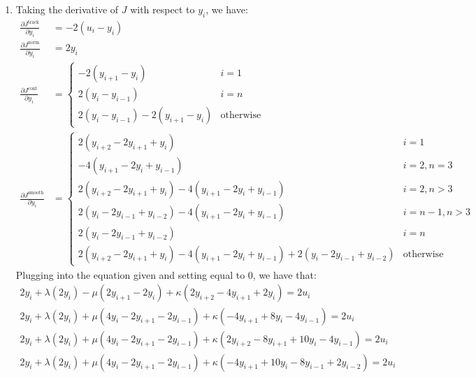 \documentclass[12pt]{exam}
\begin{document}
\begin{questions}
\begin{solution}
  \begin{enumerate}[label=(\alph*)]
    \item Taking the derivative of $J$ with respect to $y_i$, we have:
    \begin{align*}
      \frac{\partial J^{\text{track}}}{\partial y_i} &= -2(u_i - y_i) \\
      \frac{\partial J^{\text{norm}}}{\partial y_i} &= 2y_i \\
      \frac{\partial J^{\text{cont}}}{\partial y_i} &= 
      \begin{cases}
      - 2(y_{i+1} - y_{i}) & i = 1 \\
        2(y_i - y_{i-1}) & i = n \\
        2(y_i - y_{i-1}) - 2(y_{i+1} - y_{i}) & \text{otherwise}
      \end{cases} \\
      \frac{\partial J^{\text{smooth}}}{\partial y_i} &= 
      \begin{cases}
          2(y_{i+2} - 2y_{i+1} + y_{i}) & i = 1 \\
          -4(y_{i+1} - 2y_{i} + y_{i-1}) &  i = 2, n = 3\\
          2(y_{i+2} - 2y_{i+1} + y_{i}) - 4(y_{i+1} - 2y_{i} + y_{i-1}) & i = 2, n > 3 \\
          2(y_{i} - 2y_{i-1} + y_{i-2}) - 4(y_{i+1} - 2y_{i} + y_{i-1}) & i = n - 1, n > 3 \\
          2(y_{i} - 2y_{i-1} + y_{i-2}) & i = n \\
          2(y_{i+2} - 2y_{i+1} + y_{i}) - 4(y_{i+1} - 2y_{i} + y_{i-1}) + 2(y_i - 2y_{i-1} + y_{i-2}) & \text{otherwise}
      \end{cases}
    \end{align*}
    Plugging into the equation given and setting equal to $0$, we have that:
    \begin{align*}
      2y_i +  \lambda (2y_i) - \mu(2y_{i+1} - 2y_i) + \kappa(2y_{i+2} - 4y_{i+1} + 2y_i) = 2u_i \tag{$i = 1$} \\
      2y_i + \lambda (2y_i) + \mu(4y_i - 2y_{i+1} - 2y_{i-1}) + \kappa(-4y_{i+1} + 8y_{i} -4y_{i-1}) = 2u_i \tag{$i=2, n = 3$} \\
      2y_i + \lambda (2y_i) + \mu(4y_i - 2y_{i+1} - 2y_{i-1}) + \kappa(2y_{i+2} - 8y_{i+1} + 10y_{i} -4y_{i-1} ) = 2u_i \tag{$i = 2, n > 3$} \\
      2y_i + \lambda (2y_i) + \mu(4y_i - 2y_{i+1} - 2y_{i-1}) + \kappa(-4y_{i+1} + 10y_i -8y_{i-1} + 2y_{i-2}) = 2u_i \tag{$i = n - 1, n > 3$} \\

\end{align*}
\end{enumerate}
\end{solution}
\end{questions}
\end{document}
